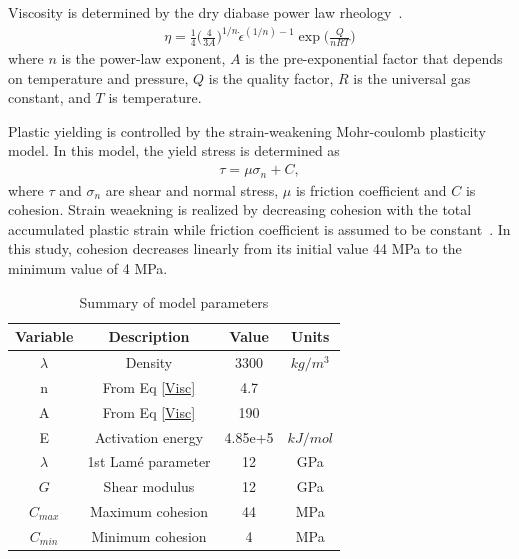 \documentclass[letterpaper,12pt,notitle]{memphisthesis}                     %
\begin{document}
Viscosity is determined by the dry diabase power law rheology~\citep{Kirby1987, Chen1990}.
\begin{align} \label{Visc}
 \eta = \frac{1}{4} \bigg( \frac{4}{3A} \bigg)^{1/n} \dot{\epsilon}^{(1/n)-1} \exp\bigg(\frac{Q}{nRT}\bigg)
\end{align}
where $n$ is the power-law exponent, $A$ is the pre-exponential factor that depends on temperature and pressure, $Q$ is the quality factor, $R$ is the universal gas constant, and $T$ is temperature.
%

Plastic yielding is controlled by the strain-weakening Mohr-coulomb plasticity model. In this model, the yield stress is determined as
\begin{align}
 \tau = \mu \sigma_n + C,
\end{align}
where $\tau$ and $\sigma_{n}$ are shear and normal stress, $\mu$ is friction coefficient and $C$ is cohesion.
%
Strain weaekning is realized by decreasing cohesion with the total accumulated plastic strain while friction coefficient is assumed to be constant~\citep{Poliakov1998}. In this study, cohesion decreases linearly from its initial value 44 MPa to the minimum value of 4 MPa.
%
\begin{table}[h!]
	\centering
	\caption{Summary of model parameters}
	\label{tab:modelparams}
	\begin{tabular}{cccc}
		\toprule
		Variable & Description & Value & Units\\
		\midrule
          	$\lambda$ & Density & 3300 & $kg/m^3$\\
	        n & From Eq \ref{Visc} & 4.7 & \\
	        A & From Eq \ref{Visc} & 190 & \\
	        E & Activation energy & 4.85e+5 & $kJ/mol$ \\
	        $\lambda$ & 1st Lam\'e parameter & 12 & GPa\\
	        $G$ & Shear modulus & 12 & GPa\\
	        $C_{max}$ & Maximum cohesion & 44 & MPa\\
	        $C_{min}$ & Minimum cohesion & 4 & MPa\\
		\bottomrule
	\end{tabular}
\end{table}
%
\end{document}
